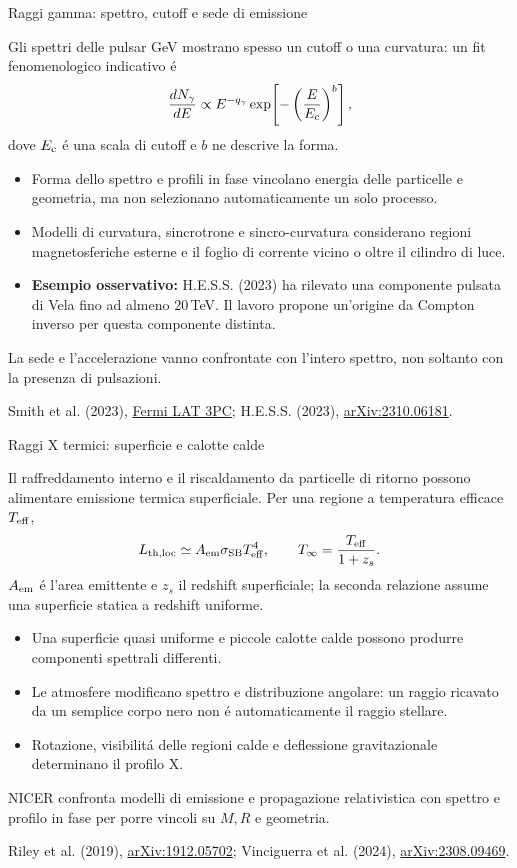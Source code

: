 \begin{frame}[t]{Raggi gamma: spettro, cutoff e sede di emissione}
\small\raggedright
Gli spettri delle pulsar GeV mostrano spesso un cutoff o una curvatura:
un fit fenomenologico indicativo \'e
\[
\frac{dN_\gamma}{dE}\propto E^{-q_\gamma}
\exp\!\left[-\left(\frac{E}{E_{\rm c}}\right)^b\right],
\]
dove $E_{\rm c}$ \'e una scala di cutoff e $b$ ne descrive la forma.
\begin{itemize}
\item Forma dello spettro e profili in fase vincolano energia delle particelle
e geometria, ma non selezionano automaticamente un solo processo.
\item Modelli di curvatura, sincrotrone e sincro-curvatura considerano
regioni magnetosferiche esterne e il foglio di corrente vicino o oltre il cilindro di luce.
\item \textbf{Esempio osservativo:} H.E.S.S. (2023) ha rilevato
una componente pulsata di Vela fino ad almeno $20\,$TeV.
Il lavoro propone un'origine da Compton inverso per questa componente distinta.
\end{itemize}
La sede e l'accelerazione vanno confrontate con l'intero spettro,
non soltanto con la presenza di pulsazioni.
\par\smallskip
\footnotesize Smith et al. (2023), \href{https://arxiv.org/abs/2307.11132}{Fermi LAT 3PC};
H.E.S.S. (2023), \href{https://arxiv.org/abs/2310.06181}{arXiv:2310.06181}.
\end{frame}

\begin{frame}[t]{Raggi X termici: superficie e calotte calde}
\small\raggedright
Il raffreddamento interno e il riscaldamento da particelle di ritorno
possono alimentare emissione termica superficiale.
Per una regione a temperatura efficace $T_{\rm eff}$,
\[
L_{\rm th,loc}\simeq A_{\rm em}\sigma_{\rm SB}T_{\rm eff}^4,
\qquad
T_\infty=\frac{T_{\rm eff}}{1+z_s}.
\]
$A_{\rm em}$ \'e l'area emittente e $z_s$ il redshift superficiale;
la seconda relazione assume una superficie statica a redshift uniforme.
\begin{itemize}
\item Una superficie quasi uniforme e piccole calotte calde
possono produrre componenti spettrali differenti.
\item Le atmosfere modificano spettro e distribuzione angolare:
un raggio ricavato da un semplice corpo nero non \'e automaticamente il raggio stellare.
\item Rotazione, visibilit\'a delle regioni calde e deflessione gravitazionale
determinano il profilo X.
\end{itemize}
NICER confronta modelli di emissione e propagazione relativistica con
spettro e profilo in fase per porre vincoli su $M,R$ e geometria.
\par\smallskip
\footnotesize Riley et al. (2019), \href{https://arxiv.org/abs/1912.05702}{arXiv:1912.05702};
Vinciguerra et al. (2024), \href{https://arxiv.org/abs/2308.09469}{arXiv:2308.09469}.
\end{frame}


